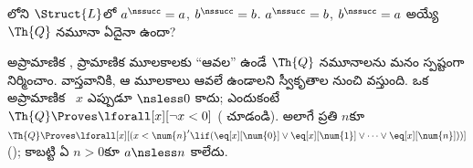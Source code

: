 \documentclass[../../../include/open-logic-section]{subfiles}
\begin{document}
\begin{prob}
లోని $\Struct{L}$లో
$a^\nssucc=a$, $b^\nssucc=b$. $a^\nssucc=b$,
$b^\nssucc=a$ అయ్యే $\Th{Q}$ నమూనా ఏదైనా ఉందా?
\end{prob}

\begin{explain}
అప్రామాణిక , ప్రామాణిక మూలకాలకు
“ఆవల” ఉండే $\Th{Q}$ నమూనాలను మనం స్పష్టంగా నిర్మించాం. వాస్తవానికి,
ఆ మూలకాలు ఆవలే ఉండాలని స్వీకృతాల నుంచి వస్తుంది. ఒక అప్రామాణిక
~$x$ ఎప్పుడూ ${}\nsless 0$ కాదు; ఎందుకంటే $\Th{Q}\Proves\lforall[x][\lnot x<0]$
( చూడండి). అలాగే ప్రతి $n$కూ
$\Th{Q}\Proves\lforall[x][(x<\num{n}'\lif
(\eq[x][\num{0}]\lor\eq[x][\num{1}]\lor\dots\lor
\eq[x][\num{n}]))]$ (); కాబట్టి
ఏ $n>0$కూ $a\nsless n$ కాలేదు.
\end{explain}
\end{document}
